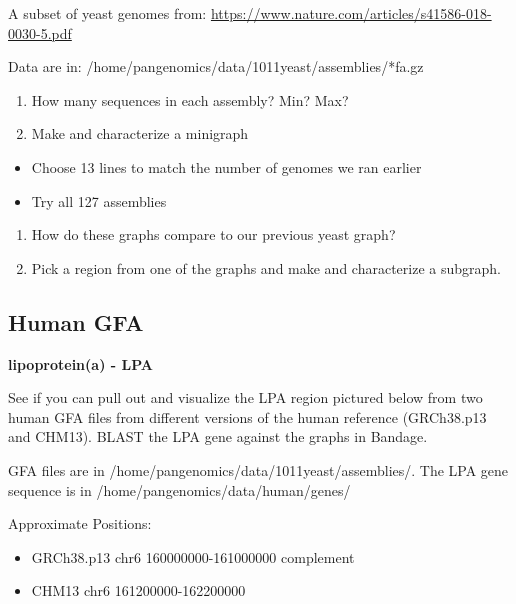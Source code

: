 \documentclass[
]{book}
\providecommand{\tightlist}{%
  \setlength{\itemsep}{0pt}\setlength{\parskip}{0pt}}
\begin{document}
A subset of yeast genomes from: \url{https://www.nature.com/articles/s41586-018-0030-5.pdf}

Data are in: /home/pangenomics/data/1011yeast/assemblies/*fa.gz

\begin{enumerate}
\def\labelenumi{\arabic{enumi}.}
\tightlist
\item
  How many sequences in each assembly? Min? Max?
\item
  Make and characterize a minigraph
\end{enumerate}

\begin{itemize}
\tightlist
\item
  Choose 13 lines to match the number of genomes we ran earlier\\
\item
  Try all 127 assemblies\\
\end{itemize}

\begin{enumerate}
\def\labelenumi{\arabic{enumi}.}
\setcounter{enumi}{2}
\tightlist
\item
  How do these graphs compare to our previous yeast graph?
\item
  Pick a region from one of the graphs and make and characterize a subgraph.
\end{enumerate}

\hypertarget{human-gfa}{%
\subsection*{Human GFA}\label{human-gfa}}

\textbf{lipoprotein(a) - LPA}

See if you can pull out and visualize the LPA region pictured below from two human GFA files from different versions of the human reference (GRCh38.p13 and CHM13). BLAST the LPA gene against the graphs in Bandage.

GFA files are in /home/pangenomics/data/1011yeast/assemblies/. The LPA gene sequence is in /home/pangenomics/data/human/genes/

Approximate Positions:

\begin{itemize}
\item
  GRCh38.p13 chr6 160000000-161000000 complement
\item
  CHM13 chr6 161200000-162200000
\end{itemize}
\end{document}
